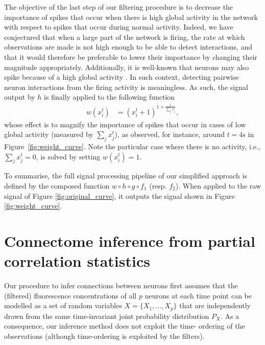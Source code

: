 \documentclass[wcp]{jmlr}
\begin{document}
The objective of the last step of our filtering procedure is to decrease the
importance of spikes that occur when there is high global activity in the
network with respect to  spikes that occur during normal activity. Indeed, we
have conjectured that when a large part of the network is firing, the rate at
which observations are made is not high enough to be able to detect
interactions, and that it would therefore be preferable to lower their
importance by changing their magnitude appropriately. Additionally, it is
well-known that neurons may also spike because of a high global activity
\citep{stetter2012model}. In such  context, detecting pairwise neuron
interactions from the firing activity is meaningless. As such,
the signal output by $h$ is finally applied to the following function
\begin{align}
 w(x^{t}_i) &= (x^{t}_i + 1 )^{1 + \frac{1}{\sum_{j} x^{t}_j}}, \label{eq:magnify-filter}
\end{align}
whose effect is to magnify the importance of spikes that occur in cases of low
global activity (measured by $\sum_{j} x^{t}_j$), as observed, for instance,
around $t=4\text{s}$ in Figure~\ref{fig:weight_curve}. Note the particular case where there
is no activity, i.e., $\sum_{j} x^{t}_j = 0$, is solved by setting $w(x^{t}_i)
= 1$.

To summarise, the full signal processing pipeline of our simplified approach is defined by the composed function $w \circ h \circ g \circ
f_1$ (resp. $f_2$). When applied to the raw signal of Figure
\ref{fig:original_curve}, it outputs the signal shown in Figure
\ref{fig:weight_curve}.


\section{Connectome inference from partial correlation statistics}
\label{sec:inference}

Our procedure to infer connections between neurons first assumes that
the (filtered) fluorescence concentrations of all $p$ neurons at each
time point can be modelled as a set of random variables $X = \{X_1,
\dots, X_p\}$ that are independently drawn from the same time-invariant
joint probability distribution $P_X$. 
As a consequence, our inference method does not exploit the time-
ordering of the observations (although time-ordering is exploited by
the filters).
\end{document}
